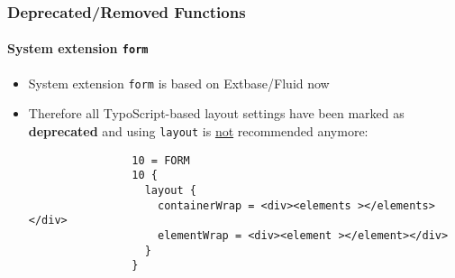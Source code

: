 \begin{frame}[fragile]
	\frametitle{Deprecated/Removed Functions}
	\framesubtitle{System extension \texttt{form}}

	\begin{itemize}

		\item System extension \texttt{form} is based on Extbase/Fluid now

		\item Therefore all TypoScript-based layout settings have been marked as
			\textbf{deprecated} and using \texttt{layout} is \underline{not}
			recommended anymore:

			\begin{lstlisting}
				10 = FORM
				10 {
				  layout {
				    containerWrap = <div><elements ></elements></div>
				    elementWrap = <div><element ></element></div>
				  }
				}
			\end{lstlisting}

	\end{itemize}

\end{frame}


